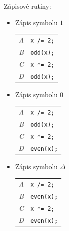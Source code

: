 \documentclass[11pt,a4paper]{article}
\begin{document}
Zápisové rutiny:
\begin{itemize}
    \item Zápis symbolu $1$
        \begin{flushright}
        \begin{minipage}{0.90\textwidth}
            \begin{tabular}{r|l}
                \textit{A} & \texttt{x /= 2;}\\
                \textit{B} & \texttt{odd(x);}\\
                \textit{C} & \texttt{x *= 2;}\\
                \textit{D} & \texttt{odd(x);}
            \end{tabular}
        \end{minipage}
        \end{flushright}
    \item Zápis symbolu $0$
        \begin{flushright}
        \begin{minipage}{0.90\textwidth}
            \begin{tabular}{r|l}
                \textit{A} & \texttt{x /= 2;}\\
                \textit{B} & \texttt{odd(x);}\\
                \textit{C} & \texttt{x *= 2;}\\
                \textit{D} & \texttt{even(x);}
            \end{tabular}
        \end{minipage}
        \end{flushright}
    \item Zápis symbolu $\Delta$
        \begin{flushright}
        \begin{minipage}{0.90\textwidth}
            \begin{tabular}{r|l}
                \textit{A} & \texttt{x /= 2;}\\
                \textit{B} & \texttt{even(x);}\\
                \textit{C} & \texttt{x *= 2;}\\
                \textit{D} & \texttt{even(x);}
            \end{tabular}
        \end{minipage}
        \end{flushright}
\end{itemize}

\newpage
\end{document}
